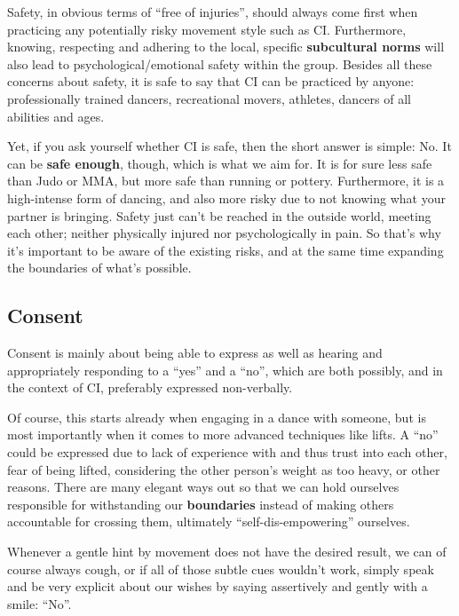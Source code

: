 Safety, in obvious terms of ``free of injuries'', should always come first when practicing any potentially risky movement style such as CI\@.
Furthermore, knowing, respecting and adhering to the local, specific \textbf{subcultural norms} will also lead to psychological/emotional safety within the group.
Besides all these concerns about safety, it is safe to say that CI can be practiced by anyone: professionally trained dancers, recreational movers, athletes, dancers of all abilities and ages.

Yet, if you ask yourself whether CI is safe, then the short answer is simple: No.
It can be \textbf{safe enough}, though, which is what we aim for.
It is for sure less safe than Judo or MMA, but more safe than running or pottery.
Furthermore, it is a high-intense form of dancing, and also more risky due to not knowing what your partner is bringing.
Safety just can't be reached in the outside world, meeting each other; neither physically injured nor psychologically in pain.
So that's why it's important to be aware of the existing risks, and at the same time expanding the boundaries of what's possible.

\subsection{Consent}\label{sec:consent}

Consent is mainly about being able to express as well as hearing and appropriately responding to a ``yes'' and a ``no'', which are both possibly, and in the context of CI, preferably expressed non-verbally.

Of course, this starts already when engaging in a dance with someone, but is most importantly when it comes to more advanced techniques like lifts.
A ``no'' could be expressed due to lack of experience with and thus trust into each other, fear of being lifted, considering the other person's weight as too heavy, or other reasons.
There are many elegant ways out so that we can hold ourselves responsible for withstanding our \textbf{boundaries} instead of making others accountable for crossing them, ultimately ``self-dis-empowering'' ourselves.

Whenever a gentle hint by movement does not have the desired result, we can of course always cough, or if all of those subtle cues wouldn't work, simply speak and be very explicit about our wishes by saying assertively and gently with a smile: ``No''.

